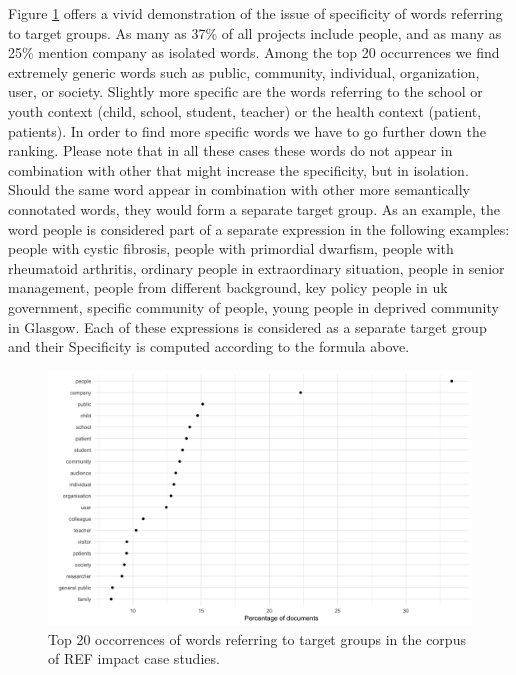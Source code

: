 \documentclass[]{book}
\begin{document}
Figure \ref{fig:impactusersdistributions} offers a vivid demonstration
of the issue of specificity of words referring to target groups. As many
as 37\% of all projects include people, and as many as 25\% mention
company as isolated words. Among the top 20 occurrences we find
extremely generic words such as public, community, individual,
organization, user, or society. Slightly more specific are the words
referring to the school or youth context (child, school, student,
teacher) or the health context (patient, patients). In order to find
more specific words we have to go further down the ranking. Please note
that in all these cases these words do not appear in combination with
other that might increase the specificity, but in isolation. Should the
same word appear in combination with other more semantically connotated
words, they would form a separate target group. As an example, the word
people is considered part of a separate expression in the following
examples: people with cystic fibrosis, people with primordial dwarfism,
people with rheumatoid arthritis, ordinary people in extraordinary
situation, people in senior management, people from different
background, key policy people in uk government, specific community of
people, young people in deprived community in Glasgow. Each of these
expressions is considered as a separate target group and their
Specificity is computed according to the formula above.

\begin{figure}

{\centering \includegraphics[width=1\linewidth]{_bookdown_files/figures/impact_users_distributions} 

}

\caption{Top 20 occorrences of words referring to target groups in the corpus of REF impact case studies.}\label{fig:impactusersdistributions}
\end{figure}
\end{document}
